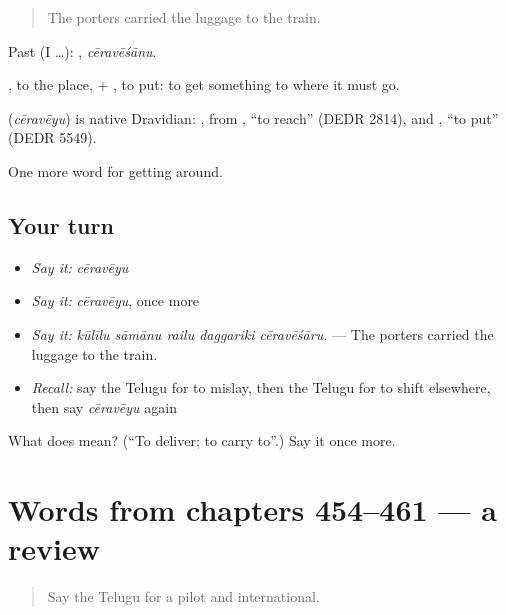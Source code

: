 \begin{quote}
The porters carried the luggage to the train.
\end{quote}

Past (I …): , \emph{cēravēśānu}.

, to the place, + , to put: to get something to where it must go.

\begin{cousinweb}
\textbf{} (\emph{cēravēyu}) is native Dravidian: , from , \textquotedblleft{}to reach\textquotedblright{} (DEDR 2814), and , \textquotedblleft{}to put\textquotedblright{} (DEDR 5549).
\end{cousinweb}

\begin{grammarlens}[title={What you've built}]
One more word for getting around.
\end{grammarlens}

\subsection*{Your turn}
\begin{itemize}
\raggedright
  \item \emph{Say it:} \emph{cēravēyu}
  \item \emph{Say it:} \emph{cēravēyu}, once more
  \item \emph{Say it:} \emph{kūlīlu sāmānu railu daggariki cēravēśāru.} — The porters carried the luggage to the train.
  \item \emph{Recall:} say the Telugu for to mislay, then the Telugu for to shift elsewhere, then say \emph{cēravēyu} again
\end{itemize}

\begin{tcolorbox}[breakable,colback=teal!4,colframe=teal!35!black,title={Before you move on}]
What does  mean? (\textquotedblleft{}To deliver; to carry to\textquotedblright{}.) Say it once more.
\end{tcolorbox}
\section[(dialogue)]{Words from chapters 454–461 — a review}

\label{lesson:TE-R461-review-454-461}



\begin{quote}
Say the Telugu for a pilot and international.
\end{quote}

